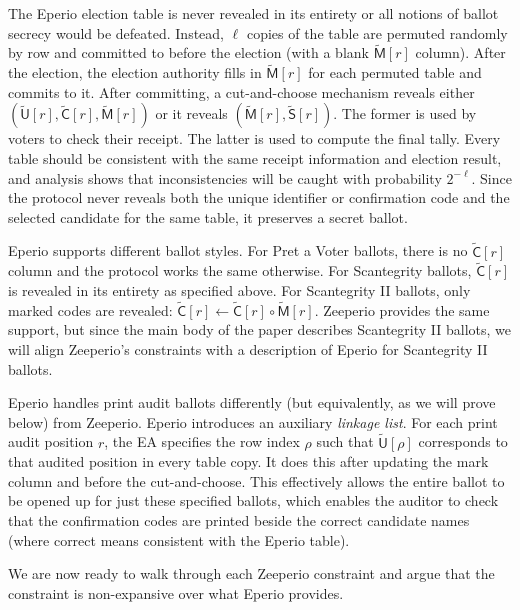 The Eperio election table is never revealed in its entirety or all notions of ballot secrecy would be defeated. Instead, $\ell$ copies of the table are permuted randomly by row and committed to before the election (with a blank $\widetilde{\mathsf{M}}[r]$ column). After the election, the election authority fills in $\widetilde{\mathsf{M}}[r]$ for each permuted table and commits to it. After committing, a cut-and-choose mechanism reveals either $(\widetilde{\mathsf{U}}[r], \widetilde{\mathsf{C}}[r],\widetilde{\mathsf{M}}[r])$ or it reveals $(\widetilde{\mathsf{M}}[r], \widetilde{\mathsf{S}}[r])$. The former is used by voters to check their receipt. The latter is used to compute the final tally. Every table should be consistent with the same receipt information and election result, and analysis shows that inconsistencies will be caught with probability $2^{-\ell}$. Since the protocol never reveals both the unique identifier or confirmation code and the selected candidate for the same table, it preserves a secret ballot. 

Eperio supports different ballot styles. For Pret a Voter ballots, there is no $\widetilde{\mathsf{C}}[r]$ column and the protocol works the same otherwise. For Scantegrity ballots, $\widetilde{\mathsf{C}}[r]$ is revealed in its entirety as specified above. For Scantegrity II ballots, only marked codes are revealed: $\widetilde{\mathsf{C}}[r]\leftarrow\widetilde{\mathsf{C}}[r]\circ\widetilde{\mathsf{M}}[r]$. Zeeperio provides the same support, but since the main body of the paper describes Scantegrity II ballots, we will align Zeeperio's constraints with a description of Eperio for Scantegrity II ballots. 

Eperio handles print audit ballots differently (but equivalently, as we will prove below) from Zeeperio. Eperio introduces an auxiliary \emph{linkage list}. For each print audit position $r$, the EA specifies the row index $\rho$ such that $\widetilde{\mathsf{U}}[\rho]$ corresponds to that audited position in every table copy. It does this after updating the mark column and before the cut-and-choose. This effectively allows the entire ballot to be opened up for just these specified ballots, which enables the auditor to check that the confirmation codes are printed beside the correct candidate names (where correct means consistent with the Eperio table). 

We are now ready to walk through each Zeeperio constraint and argue that the constraint is non-expansive over what Eperio provides.  

